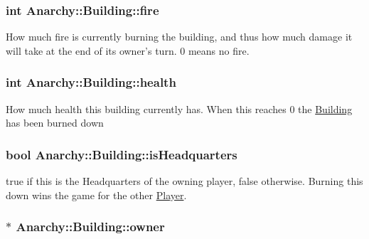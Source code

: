 \hypertarget{classAnarchy_1_1Building_a05b636d766c51eba120d9e044d82a402}{
\subsubsection[{fire}]{\setlength{\rightskip}{0pt plus 5cm}int Anarchy\-::\-Building\-::fire}}\label{classAnarchy_1_1Building_a05b636d766c51eba120d9e044d82a402}


How much fire is currently burning the building, and thus how much damage it will take at the end of its owner's turn. 0 means no fire. 

\hypertarget{classAnarchy_1_1Building_a3536e925fb8fc11bb403cc0555f935a4}{
\subsubsection[{health}]{\setlength{\rightskip}{0pt plus 5cm}int Anarchy\-::\-Building\-::health}}\label{classAnarchy_1_1Building_a3536e925fb8fc11bb403cc0555f935a4}


How much health this building currently has. When this reaches 0 the \hyperlink{classAnarchy_1_1Building}{Building} has been burned down 

\hypertarget{classAnarchy_1_1Building_a46e92ca7a40a44b467c58e1c67944d48}{
\subsubsection[{is\-Headquarters}]{\setlength{\rightskip}{0pt plus 5cm}bool Anarchy\-::\-Building\-::is\-Headquarters}}\label{classAnarchy_1_1Building_a46e92ca7a40a44b467c58e1c67944d48}


true if this is the Headquarters of the owning player, false otherwise. Burning this down wins the game for the other \hyperlink{classAnarchy_1_1Player}{Player}. 

\hypertarget{classAnarchy_1_1Building_ab3e204cfff1707cb86793b7889958e7f}{
\subsubsection[{owner}]{$\ast$ Anarchy\-::\-Building\-::owner}}\label{classAnarchy_1_1Building_ab3e204cfff1707cb86793b7889958e7f}


